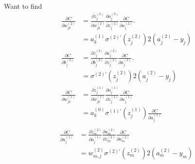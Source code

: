 Want to find
\begin{align}
\frac{\partial C}{\partial w_{jk}^{(2)}} 
&= 
\frac{\partial z_j^{(2)}}{\partial w_{jk}^{(2)}} 
\frac{\partial a_j^{(2)}}{\partial z_j^{(2)}}
\frac{\partial C}{\partial a_j^{(2)}}. \\
&= a_{k}^{(1)} \sigma^{(2)\prime}(z_j^{(2)}) 2(a_j^{(2)} - y_j) \\
\frac{\partial C}{\partial b_j^{(2)}} 
&= 
\frac{\partial z_j^{(2)}}{\partial b_{j}^{(2)}} 
\frac{\partial a_j^{(2)}}{\partial z_j^{(2)}}
\frac{\partial C}{\partial a_j^{(2)}}. \\
&= \sigma^{(2)\prime}(z_j^{(2)}) 2(a_j^{(2)} - y_j) \\
\frac{\partial C}{\partial w_{jk}^{(1)}} 
&= 
\frac{\partial z_j^{(1)}}{\partial w_{jk}^{(1)}} 
\frac{\partial a_j^{(1)}}{\partial z_{j}^{(1)}} 
\frac{\partial C}{\partial a_{j}^{(1)}} \\
&= a_k^{(0)} \sigma^{(1)\prime} (z_j^{(1)}) \frac{\partial C}{\partial a_{j}^{(1)}} \\
\end{align}
\begin{align}
\frac{\partial C}{\partial a_{j}^{(1)}} 
&= \frac{\partial z_m^{(2)}}{\partial a_{j}^{(1)}} \frac{\partial a_m^{(2)}}{\partial z_{m}^{(2)}} \frac{\partial C}{\partial a_{m}^{(2)}} \\
&= w_{m,j}^{(2)} \sigma^{(2)\prime}(z_m^{(2)}) 2(a_m^{(2)} - y_m)
\end{align}